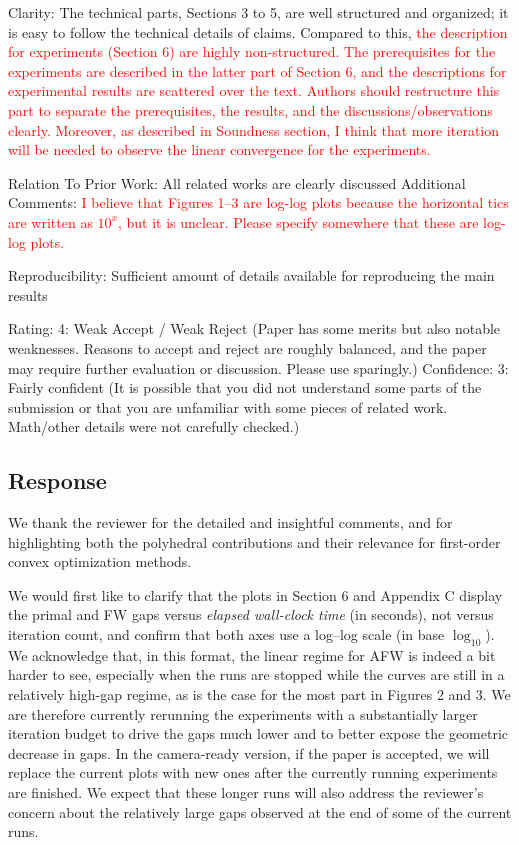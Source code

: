 \documentclass[a4wide]{article}
\begin{document}
Clarity:
The technical parts, Sections 3 to 5, are well structured and organized; it is easy to follow the technical details of claims. Compared to this, \textcolor{red}{the description for experiments (Section 6) are highly non-structured. The prerequisites for the experiments are described in the latter part of Section 6, and the descriptions for experimental results are scattered over the text. Authors should restructure this part to separate the prerequisites, the results, and the discussions/observations clearly. Moreover, as described in Soundness section, I think that more iteration will be needed to observe the linear convergence for the experiments.}

Relation To Prior Work: All related works are clearly discussed
Additional Comments:
\textcolor{red}{I believe that Figures 1--3 are log-log plots because the horizontal tics are written as $10^x$, but it is unclear. Please specify somewhere that these are log-log plots.}

Reproducibility: Sufficient amount of details available for reproducing the main results

Rating: 4: Weak Accept / Weak Reject (Paper has some merits but also notable weaknesses. Reasons to accept and reject are roughly balanced, and the paper may require further evaluation or discussion. Please use sparingly.)
Confidence: 3: Fairly confident (It is possible that you did not understand some parts of the submission or that you are unfamiliar with some pieces of related work. Math/other details were not carefully checked.)


\subsection*{Response}

We thank the reviewer for the detailed and insightful comments, and for highlighting both the polyhedral contributions and their relevance for first-order convex optimization methods.

We would first like to clarify that the plots in Section 6 and Appendix C display the primal and FW gaps versus \emph{elapsed wall-clock time} (in seconds), not versus iteration count, and confirm that both axes use a log–log scale (in base $\log_{10}$).
We acknowledge that, in this format, the linear regime for AFW is indeed a bit harder to see, especially when the runs are stopped while the curves are still in a relatively high-gap regime, as is the case for the most part in Figures 2 and 3. We are therefore currently rerunning the experiments with a substantially larger iteration budget to drive the gaps much lower and to better expose the geometric decrease in gaps. In the camera-ready version, if the paper is accepted, we will replace the current plots with new ones after the currently running experiments are finished. We expect that these longer runs will also address the reviewer's concern about the relatively large gaps observed at the end of some of the current runs.
\end{document}
